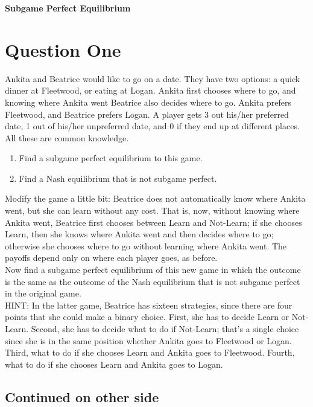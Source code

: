 \documentclass[11pt]{article}
\begin{document}
\begin{center}
{\Large \textbf{Subgame Perfect Equilibrium}}
\end{center}

\section*{Question One}

Ankita and Beatrice would like to go on a date. They have two options: a quick dinner at Fleetwood, or eating at Logan. Ankita first chooses where to go, and knowing where Ankita went Beatrice also decides where to go. Ankita prefers Fleetwood, and Beatrice prefers Logan. A player gets 3 out his/her preferred date, 1 out of his/her unpreferred date, and 0 if they end up at different places. All these are common knowledge.

\begin{enumerate}
\item Find a subgame perfect equilibrium to this game.
\item Find a Nash equilibrium that is not subgame perfect.
\end{enumerate}

Modify the game a little bit: Beatrice does not automatically know where Ankita went, but she can learn without any cost. That is, now, without knowing where Ankita went, Beatrice first chooses between Learn and Not-Learn; if she chooses Learn, then she knows where Ankita went and then decides where to go; otherwise she chooses where to go without learning where Ankita went. The payoffs depend only on where each player goes, as before.\\

Now find a subgame perfect equilibrium of this new game in which the outcome is the same as the outcome of the Nash equilibrium that is not subgame perfect in the original game. \\

HINT: In the latter game, Beatrice has sixteen strategies, since there are four points that she could make a binary choice. First, she has to decide Learn or Not-Learn. Second, she has to decide what to do if Not-Learn; that's a single choice since she is in the same position whether Ankita goes to Fleetwood or Logan. Third, what to do if she chooses Learn and Ankita goes to Fleetwood. Fourth, what to do if she chooses Learn and Ankita goes to Logan. 

\subsection*{Continued on other side}
\end{document}
